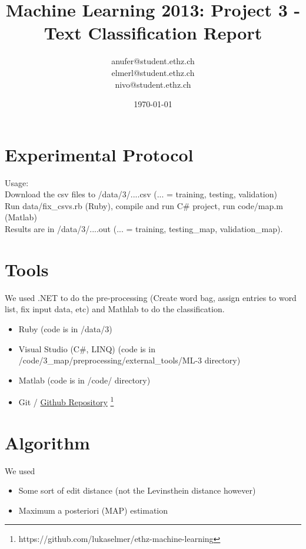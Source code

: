 \documentclass[a4paper, 11pt]{article}
\title{Machine Learning 2013: Project 3 - Text Classification Report}
\author{anufer@student.ethz.ch\\ elmerl@student.ethz.ch\\ nivo@student.ethz.ch\\}
\date{\today}
\begin{document}
\maketitle

\section*{Experimental Protocol}
Usage:\\
Download the csv files to /data/3/....csv (... = training, testing, validation)\\
Run data/fix\_csvs.rb (Ruby), compile and run C\# project, run code/map.m (Matlab) \\
Results are in /data/3/....out (... = training, testing\_map, validation\_map).





\section{Tools}
We used .NET to do the pre-processing (Create word bag, assign entries to word list, fix input data, etc) and Mathlab to do the classification.

\begin{itemize}
\item Ruby (code is in /data/3)
\item Visual Studio (C\#, LINQ) (code is in /code/3\_map/preprocessing/external\_tools/ML-3 directory)
\item Matlab (code is in /code/ directory)
\item Git / \href{https://github.com/lukaselmer/ethz-machine-learning}{Github Repository} \footnote{https://github.com/lukaselmer/ethz-machine-learning}
\end{itemize}

\section{Algorithm}

We used
\begin{itemize}
\item Some sort of edit distance (not the Levinsthein distance however)
\item Maximum a posteriori (MAP) estimation
\end{itemize}
\end{document}
